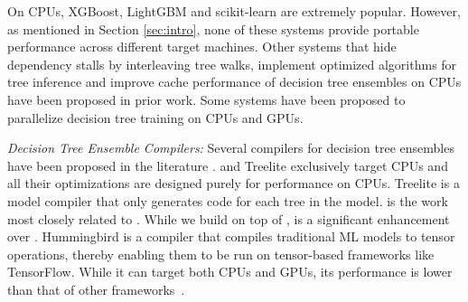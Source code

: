 On CPUs, XGBoost\cite{XGBoost}, LightGBM\cite{LightGBM} and
scikit-learn\cite{Sklearn} are extremely popular. However, 
as mentioned in Section \ref{sec:intro}, none of these systems
provide portable performance across different target machines.
Other systems that hide dependency stalls by interleaving tree walks\cite{VPred},
implement optimized algorithms for tree inference\cite{QuickScorer, QuickScorer1}
and improve cache performance of decision tree ensembles on CPUs\cite{CacheConscious1, CacheConscious2}
have been proposed in prior work.
Some systems have been proposed to parallelize decision tree training 
on CPUs and GPUs\cite{Jansson2014gpuRFAG, Nasridinov2013DecisionTC}.

\emph{Decision Tree Ensemble Compilers:}
Several compilers for decision tree ensembles have been proposed in the 
literature \cite{Treelite, Treebeard, Hummingbird}. \TreebeardOLD{} and Treelite
exclusively target CPUs and all their optimizations are designed purely for 
performance on CPUs. 
Treelite\cite{Treelite} is a model compiler that only  
generates  code for each tree in the model. 
\TreebeardOLD{} is the work most closely related to \Treebeard{}. While we 
build on top of \TreebeardOLD{}, \Treebeard{} is a significant enhancement 
over \TreebeardOLD{}. 
Hummingbird\cite{Hummingbird} is a compiler that compiles traditional ML models
to tensor operations, thereby enabling them to be run on tensor-based frameworks like
TensorFlow\cite{TensorFlow}. While it can target both CPUs
and GPUs, its performance is lower than that of other frameworks~\cite{Treebeard}.

